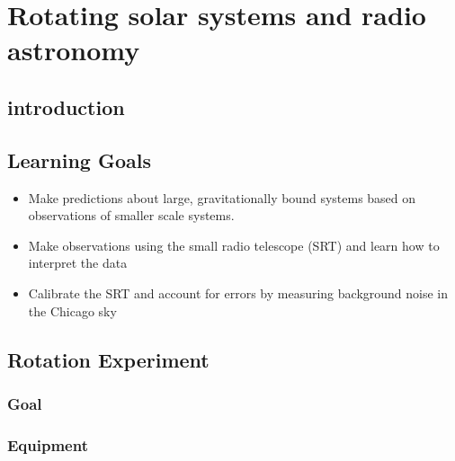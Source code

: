 \chapter{Rotating solar systems and radio astronomy}

\section{introduction} 

\section{Learning Goals}
\begin{itemize}
	\item Make predictions about large, gravitationally bound systems based on observations of smaller scale systems.
	
	\item Make observations using the small radio telescope (SRT) and learn how to interpret the data
	
	\item Calibrate the SRT and account for errors by measuring background noise in the Chicago sky 
\end{itemize}

\section{Rotation Experiment} %

\subsection{Goal}

\subsection{Equipment}

